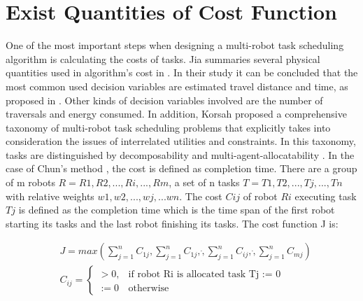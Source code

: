 \section{Exist Quantities of Cost Function}
\label{sec:cost_function}
One of the most important steps when designing a multi-robot task scheduling algorithm is calculating the costs of tasks. Jia summaries several physical quantities used in algorithm's cost in \cite{Jia2013ASA}. In their study it can be concluded that the most common used decision variables are estimated travel distance and time, as proposed in \cite{Dong2015}. Other kinds of decision variables involved are the number of traversals and energy consumed. 
In addition, Korsah proposed a comprehensive taxonomy of multi-robot task scheduling problems that explicitly takes into consideration the issues of interrelated utilities and constraints. In this taxonomy, tasks are distinguished by decomposability and multi-agent-allocatability \cite{Korsah13}.
In the case of Chun's method \cite{Chun12}, the cost is defined as completion time. There are a group of m robots $R = {R1,R2,...,Ri,...,Rm}$, a set of n tasks $T = {T1,T2,...,Tj,...,Tn}$ with relative weights ${w1, w2, ..., wj , ...wn}$. The cost $Cij$ of robot $Ri$ executing task $Tj$ is defined as the completion time which is the time span of the first robot starting its tasks and the last robot finishing its tasks.
The cost function J is:

\begin{equation}
	\label{eq:large_execute_task_cost} 
	\begin{aligned}
    & J = max( \sum_{j=1}^n C_{1j}, \sum_{j=1}^n C_{1j},\dot,\sum_{j=1}^n C_{ij},\dot,\sum_{j=1}^n C_{mj})\\
    &  C_{ij} = \left\{
            \begin{array}{lr}
            > 0, & \mbox{if robot Ri is allocated task Tj := 0}\\
            :=0 &  \mbox{otherwise}
             \end{array}
        \right.
	\end{aligned}
\end{equation}
